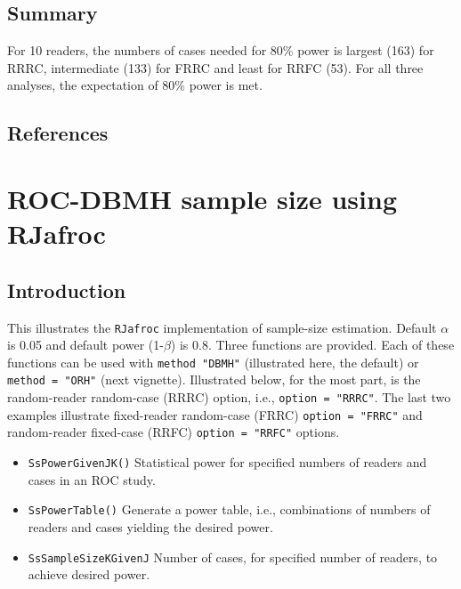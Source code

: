\documentclass[]{book}
\providecommand{\tightlist}{%
  \setlength{\itemsep}{0pt}\setlength{\parskip}{0pt}}
\begin{document}
\hypertarget{summary-5}{%
\section{Summary}\label{summary-5}}

For 10 readers, the numbers of cases needed for 80\% power is largest (163) for RRRC, intermediate (133) for FRRC and least for RRFC (53). For all three analyses, the expectation of 80\% power is met.

\hypertarget{references-7}{%
\section{References}\label{references-7}}

\hypertarget{SSRocDBMHRJafroc}{%
\chapter{ROC-DBMH sample size using RJafroc}\label{SSRocDBMHRJafroc}}

\hypertarget{introduction-8}{%
\section{Introduction}\label{introduction-8}}

This illustrates the \texttt{RJafroc} implementation of sample-size estimation. Default \(\alpha\) is 0.05 and default power (1-\(\beta\)) is 0.8. Three functions are provided. Each of these functions can be used with \texttt{method\ "DBMH"} (illustrated here, the default) or \texttt{method\ =\ "ORH"} (next vignette). Illustrated below, for the most part, is the random-reader random-case (RRRC) option, i.e., \texttt{option\ =\ "RRRC"}. The last two examples illustrate fixed-reader random-case (FRRC) \texttt{option\ =\ "FRRC"} and random-reader fixed-case (RRFC) \texttt{option\ =\ "RRFC"} options.

\begin{itemize}
\tightlist
\item
  \texttt{SsPowerGivenJK()}
  Statistical power for specified numbers of readers and cases in an ROC study.
\item
  \texttt{SsPowerTable()}
  Generate a power table, i.e., combinations of numbers of readers and cases yielding the desired power.
\item
  \texttt{SsSampleSizeKGivenJ}
  Number of cases, for specified number of readers, to achieve desired power.
\end{itemize}
\end{document}
